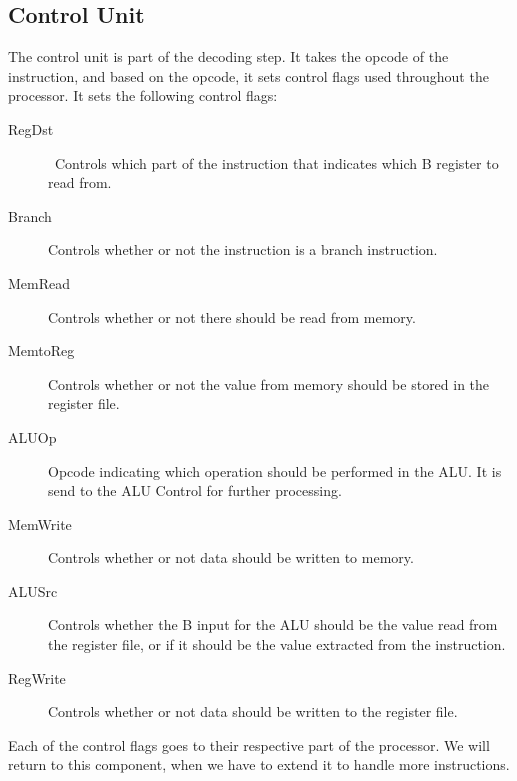 \subsection{Control Unit}
\label{sec:control-unit}
The control unit is part of the decoding step. It takes the opcode of the
instruction, and based on the opcode, it sets control flags used throughout the
processor. It sets the following control flags:
\begin{description}
    \item[RegDst] Controls which part of the instruction that indicates which
        B register to read from.

    \item[Branch] Controls whether or not the instruction is a branch
        instruction.

    \item[MemRead] Controls whether or not there should be read from memory.

    \item[MemtoReg] Controls whether or not the value from memory should be
        stored in the register file.

    \item[ALUOp] Opcode indicating which operation should be performed in
        the ALU. It is send to the ALU Control for further processing.

    \item[MemWrite] Controls whether or not data should be written to memory.

    \item[ALUSrc] Controls whether the B input for the ALU should be the
        value read from the register file, or if it should be the value
        extracted from the instruction.

    \item[RegWrite] Controls whether or not data should be written to the
        register file.



\end{description}
Each of the control flags goes to their respective part of the processor.
We will return to this component, when we have to extend it to handle more
instructions.

